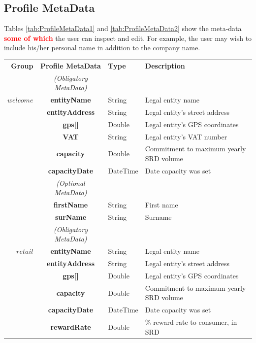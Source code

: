 \subsection{Profile MetaData}
Tables \ref{tab:ProfileMetaData1} and \ref{tab:ProfileMetaData2} show the meta-data \textcolor{red}{\bf some of which} the user can inspect and edit. For example, the user may wish to include his/her personal name in addition to the company name. 

\setlength{\tabcolsep}{10pt}
\begin{table}[H]
\begin{centering}
\small
{
\begin{tabular}{ r | c | l | l }
\hline
\textbf{Group}	& {\bf Profile MetaData} & {\bf Type} & {\bf Description} \\
\Xhline{1.5pt}
			& \emph{(Obligatory MetaData)} & & \\
\cline{2-2}
$welcome$	& {\bf entityName}			&String	& Legal entity name \\
			& {\bf entityAddress}			&String	& Legal entity's street address \\
			& {\bf gps[]}				&Double	& Legal entity's GPS coordinates \\			
			& {\bf VAT}				&String	& Legal entity's VAT number \\
			& {\bf capacity}				&Double	& Commitment to maximum yearly SRD volume \\
			& {\bf capacityDate}			&DateTime & Date capacity was set \\
\cline{2-2}
			 & \emph{(Optional MetaData)}& & \\
\cline{2-2}
			& {\bf firstName}			&String	& First name \\
			& {\bf surName}			&String	& Surname \\
\Xhline{1.5pt}
			& \emph{(Obligatory MetaData)} & & \\
\cline{2-2}
$retail$		& {\bf entityName}			&String	& Legal entity name \\
			& {\bf entityAddress}			&String	& Legal entity's street address \\
			& {\bf gps[]}				&Double	& Legal entity's GPS coordinates \\			
			& {\bf capacity}				&Double	& Commitment to maximum yearly SRD volume \\
			& {\bf capacityDate}			&DateTime & Date capacity was set \\
			& {\bf rewardRate}			&Double	& \% reward rate to consumer, in SRD \\

\end{tabular}}
\end{centering}
\end{table}
